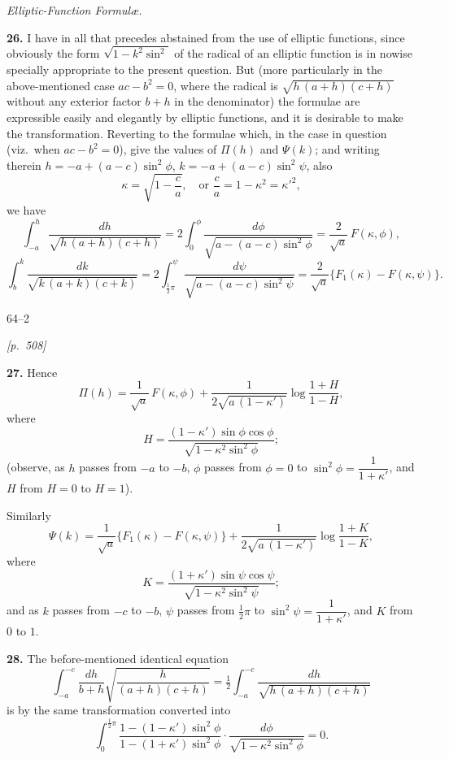 \documentclass[11pt]{article}
\begin{document}
\medskip

\begin{center}\textit{Elliptic-Function Formul\ae.}\end{center}

\medskip

\textbf{26.} I have in all that precedes abstained from the use of
elliptic functions, since obviously the form $\sqrt{1-k^{2}\sin^{2}}$
of the radical of an elliptic function is in nowise specially
appropriate to the present question. But (more particularly in the
above-mentioned case $ac-b^{2}=0$, where the radical is
$\sqrt{h\,(a+h)(c+h)}$ without any exterior factor $b+h$ in the
denominator) the formulae are expressible easily and elegantly by
elliptic functions, and it is desirable to make the transformation.
Reverting to the formulae which, in the case in question (viz.\ when
$ac-b^{2}=0$), give the values of $\Pi(h)$ and $\Psi(k)$; and writing
therein $h=-a+(a-c)\sin^{2}\phi$, $k=-a+(a-c)\sin^{2}\psi$, also
\[
\kappa=\sqrt{1-\frac{c}{a}},\quad\text{or }\frac{c}{a}=1-\kappa^{2}=\kappa'^{2},
\]
we have
\[
\int_{-a}^{h}\frac{dh}{\sqrt{h\,(a+h)(c+h)}}
=2\int_{0}^{\phi}\frac{d\phi}{\sqrt{a-(a-c)\sin^{2}\phi}}
=\frac{2}{\sqrt{a}}\,F(\kappa,\phi),
\]
\[
\int_{b}^{k}\frac{dk}{\sqrt{k\,(a+k)(c+k)}}
=2\int_{\tfrac{1}{2}\pi}^{\psi}\frac{d\psi}{\sqrt{a-(a-c)\sin^{2}\psi}}
=\frac{2}{\sqrt{a}}\{F_{1}(\kappa)-F(\kappa,\psi)\}.
\]

\medskip

\hfill 64--2

\newpage

\noindent\textit{[p.~508]}

\medskip

\textbf{27.} Hence
\[
\Pi(h)=\frac{1}{\sqrt{a}}\,F(\kappa,\phi)
+\frac{1}{2\sqrt{a\,(1-\kappa')}}\log\frac{1+H}{1-H},
\]
where
\[
H=\frac{(1-\kappa')\sin\phi\cos\phi}{\sqrt{1-\kappa^{2}\sin^{2}\phi}};
\]
(observe, as $h$ passes from $-a$ to $-b$, $\phi$ passes from $\phi=0$
to $\sin^{2}\phi=\dfrac{1}{1+\kappa'}$, and $H$ from $H=0$ to $H=1$).

Similarly
\[
\Psi(k)=\frac{1}{\sqrt{a}}\{F_{1}(\kappa)-F(\kappa,\psi)\}
+\frac{1}{2\sqrt{a\,(1-\kappa')}}\log\frac{1+K}{1-K},
\]
where
\[
K=\frac{(1+\kappa')\sin\psi\cos\psi}{\sqrt{1-\kappa^{2}\sin^{2}\psi}};
\]
and as $k$ passes from $-c$ to $-b$, $\psi$ passes from $\tfrac{1}{2}\pi$ to
$\sin^{2}\psi=\dfrac{1}{1+\kappa'}$, and $K$ from $0$ to $1$.

\textbf{28.} The before-mentioned identical equation
\[
\int_{-a}^{-c}\frac{dh}{b+h}\sqrt{\frac{h}{(a+h)(c+h)}}
=\tfrac{1}{2}\int_{-a}^{-c}\frac{dh}{\sqrt{h\,(a+h)(c+h)}}
\]
is by the same transformation converted into
\[
\int_{0}^{\tfrac{1}{2}\pi}\frac{1-(1-\kappa')\sin^{2}\phi}
{1-(1+\kappa')\sin^{2}\phi}\cdot\frac{d\phi}{\sqrt{1-\kappa^{2}\sin^{2}\phi}}=0.
\]
\end{document}
